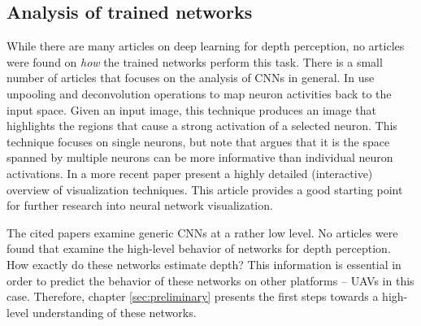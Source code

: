 \subsection{Analysis of trained networks}
\label{sec:dl_analysis}
While there are many articles on deep learning for depth perception, no articles were found on \emph{how} the trained networks perform this task.
There is a small number of articles that focuses on the analysis of \acp{CNN} in general.
In \cite{Zeiler2013} \citeauthor{Zeiler2013} use unpooling and deconvolution operations to map neuron activities back to the input space.
Given an input image, this technique produces an image that highlights the regions that cause a strong activation of a selected neuron.
This technique focuses on single neurons, but note that \cite{Szegedy2013} argues that it is the space spanned by multiple neurons can be more informative than individual neuron activations.
In a more recent paper \citeauthor{Olah2017} \cite{Olah2017} present a highly detailed (interactive) overview of visualization techniques.
This article provides a good starting point for further research into neural network visualization.

The cited papers examine generic \acp{CNN} at a rather low level.
No articles were found that examine the high-level behavior of networks for depth perception.
How exactly do these networks estimate depth?
This information is essential in order to predict the behavior of these networks on other platforms -- \acp{UAV} in this case.
Therefore, chapter \ref{sec:preliminary} presents the first steps towards a high-level understanding of these networks.
